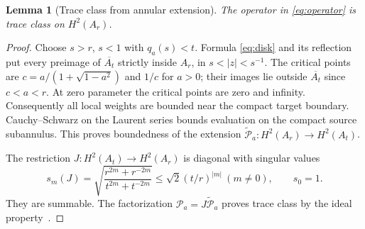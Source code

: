 \documentclass[10pt]{article}
\newtheorem{lemma}{Lemma}
\newcommand{\PP}{\mathcal P}
\begin{document}
\begin{lemma}[Trace class from annular extension]
The operator in \eqref{eq:operator} is trace class on $H^2(A_r)$.
\end{lemma}
\begin{proof}
Choose $s>r$, $s<1$ with $q_a(s)<t$. Formula \eqref{eq:disk} and its
reflection put every preimage of $\overline{A_t}$ strictly inside
$A_r$, in $s<|z|<s^{-1}$. The critical points are
$c=a/(1+\sqrt{1-a^2})$ and $1/c$ for $a>0$; their images lie outside
$\overline{A_t}$ since $c<a<r$. At zero parameter the critical points
are zero and infinity. Consequently all local weights are bounded near the
compact target boundary. Cauchy--Schwarz on the Laurent series bounds
evaluation on the compact source subannulus. This proves boundedness of
the extension $\widetilde{\PP}_a:H^2(A_r)\to H^2(A_t)$.

The restriction $J:H^2(A_t)\to H^2(A_r)$ is diagonal with singular values
\[
 s_m(J)=\sqrt{\frac{r^{2m}+r^{-2m}}{t^{2m}+t^{-2m}}}
 \leq\sqrt2(t/r)^{|m|}\ (m\ne0),\qquad s_0=1.
\]
They are summable. The factorization $\PP_a=J\widetilde{\PP}_a$ proves
trace class by the ideal property~\cite{Simon}.
\end{proof}
\end{document}
